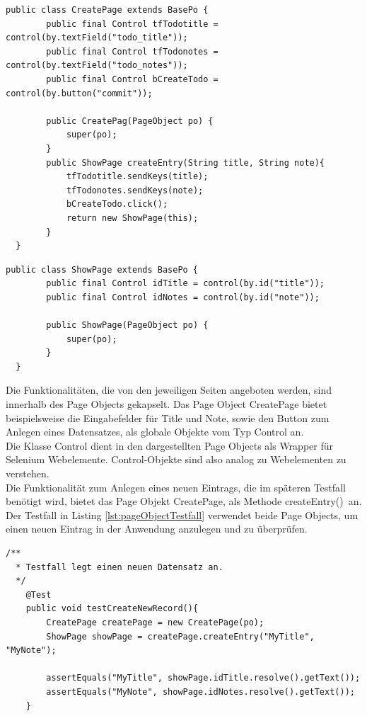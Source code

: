 \begin{lstlisting}[caption={Page Object CreatePage},label={lst:poCreatePage}]
  public class CreatePage extends BasePo {
		public final Control tfTodotitle = control(by.textField("todo_title"));
		public final Control tfTodonotes = control(by.textField("todo_notes"));
		public final Control bCreateTodo = control(by.button("commit"));
		
		public CreatePag(PageObject po) {
			super(po);
		}
		public ShowPage createEntry(String title, String note){
			tfTodotitle.sendKeys(title);
			tfTodonotes.sendKeys(note);
			bCreateTodo.click();
			return new ShowPage(this);
		}
  }
\end{lstlisting}  
\begin{lstlisting}[caption={Page Object ShowPage},label={lst:poShowPage}]  
  public class ShowPage extends BasePo {
		public final Control idTitle = control(by.id("title"));
		public final Control idNotes = control(by.id("note"));

		public ShowPage(PageObject po) {
			super(po);
		}
  }
\end{lstlisting}

Die Funktionalitäten, die von den jeweiligen Seiten angeboten werden, sind innerhalb des Page Objects gekapselt. Das Page Object CreatePage bietet beispielsweise die Eingabefelder für Title und Note, sowie den Button zum Anlegen eines Datensatzes, als globale Objekte vom Typ Control an.\\
Die Klasse Control dient in den dargestellten Page Objects als Wrapper für Selenium Webelemente. Control-Objekte sind also analog zu Webelementen zu verstehen.\\
Die Funktionalität zum Anlegen eines neuen Eintrags, die im späteren Testfall benötigt wird, bietet das Page Objekt CreatePage, als Methode \grq createEntry()\grq\ an.\\

Der Testfall in Listing \ref{lst:pageObjectTestfall} verwendet beide Page Objects, um einen neuen Eintrag in der Anwendung anzulegen und zu überprüfen.\\


\begin{lstlisting}[caption={Page Object Testfall},label={lst:pageObjectTestfall}]  
  /**
  * Testfall legt einen neuen Datensatz an.
  */
 	@Test
	public void testCreateNewRecord(){
		CreatePage createPage = new CreatePage(po);
		ShowPage showPage = createPage.createEntry("MyTitle", "MyNote");

		assertEquals("MyTitle", showPage.idTitle.resolve().getText());
		assertEquals("MyNote", showPage.idNotes.resolve().getText());
	}

\end{lstlisting}

